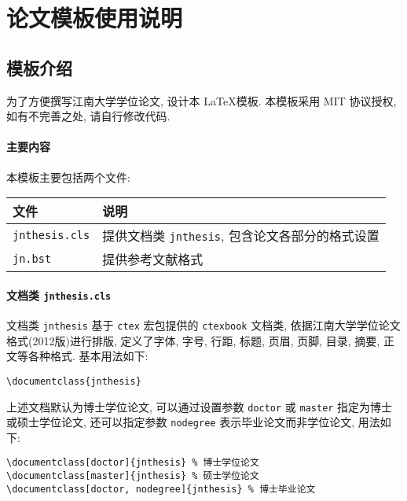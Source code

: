 

\chapter{论文模板使用说明}
\label{ch99}


\section{模板介绍}

为了方便撰写江南大学学位论文, 设计本 \LaTeX 模板.
本模板采用 MIT 协议授权, 如有不完善之处, 请自行修改代码.

\subsubsection*{主要内容}

本模板主要包括两个文件:

\begin{tabular}{ll}
\hline
文件 & 说明\\
\hline
{\tt{jnthesis.cls}} & 提供文档类 {\tt{jnthesis}}, 包含论文各部分的格式设置\\
{\tt{jn.bst}} & 提供参考文献格式\\
\hline
\end{tabular}

\subsubsection*{文档类 {\tt{jnthesis.cls}}}

文档类 {\tt jnthesis} 基于 {\tt ctex} 宏包提供的 {\tt ctexbook} 文档类,
依据江南大学学位论文格式(2012版)进行排版,
定义了字体, 字号, 行距, 标题, 页眉, 页脚, 目录, 摘要, 正文等各种格式.
基本用法如下:

\begin{lstlisting}[basicstyle=\ttfamily, frame=single]
\documentclass{jnthesis}
\end{lstlisting}

上述文档默认为博士学位论文, 可以通过设置参数 {\tt doctor} 或 {\tt master} 指定为博士或硕士学位论文, 还可以指定参数 {\tt nodegree} 表示毕业论文而非学位论文,
用法如下:
\begin{lstlisting}[basicstyle=\ttfamily, frame=single]
\documentclass[doctor]{jnthesis} % 博士学位论文
\documentclass[master]{jnthesis} % 硕士学位论文
\documentclass[doctor, nodegree]{jnthesis} % 博士毕业论文
\end{lstlisting}

